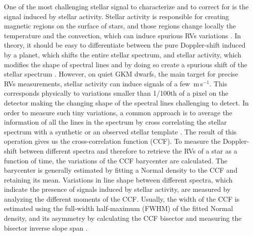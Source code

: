 \documentclass{aa}
\def\ms{\hbox{\,m\,s$^{-1}$}}         %
\begin{document}
One of the most challenging stellar signal to characterize and to correct for is the signal induced by stellar activity. 
Stellar activity is responsible for creating magnetic regions on the surface of stars, and those regions change locally the temperature and the convection, which can induce spurious RVs variations \citep[e.g.][]{Meunier-2010a, Dumusque-2014b, Borgniet-2015}. 
In theory, it should be easy to differentiate between the pure Doppler-shift induced by a planet, which shifts the entire stellar spectrum, and stellar activity, which modifies the shape of spectral lines and by doing so create a spurious shift of the stellar spectrum \citep{Saar-1997b,Hatzes-2002,Kurster2003,Lindegren-2003,Desort-2007,Lagrange-2010,Meunier-2010a,Dumusque-2014b}. 
However, on quiet GKM dwarfs, the main target for precise RVs measurements, stellar activity can induce signals of a few \ms. This corresponds physically to variations smaller than 1/100th of a pixel on the detector making the changing shape of the spectral lines challenging to detect.
In order to measure such tiny variations, a common approach is to average the information of all the lines in the spectrum by cross correlating the stellar spectrum with a synthetic or an observed stellar template \citep[][]{Baranne-1996,Pepe-2002a, Anglada-Escude-2012}. The result of this operation gives us the cross-correlation function (CCF).  
%
To measure the Doppler-shift between different spectra and therefore to retrieve the RVs of a star as a function of time, the variations of the CCF barycenter are calculated. 
The barycenter is generally estimated by fitting a Normal density to the CCF and retaining its mean. Variations in line shape between different spectra, which indicate the presence of signals induced by stellar activity, are measured by analyzing the different moments of the CCF. Usually, the width of the CCF is estimated using the full-width half-maximum (FWHM) of the fitted Normal density, and its asymmetry by calculating the CCF bisector and measuring the bisector inverse slope span \citep[BIS SPAN,][]{Queloz-2001}.

\end{document}
